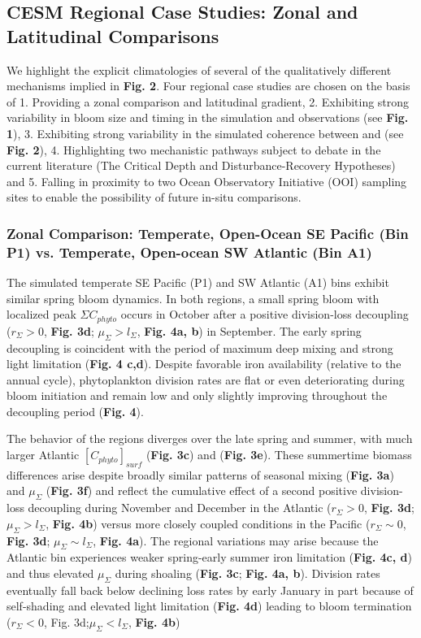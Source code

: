 \subsection{CESM Regional Case Studies: Zonal and Latitudinal Comparisons}

We highlight the explicit climatologies of several of the qualitatively different mechanisms implied in \textbf{Fig. 2}. Four regional case studies are chosen on the basis of 1. Providing a zonal comparison and latitudinal gradient, 2. Exhibiting strong variability in bloom size and timing in the simulation and observations (see \textbf{Fig. 1}), 3. Exhibiting strong variability in the simulated coherence between  and  (see \textbf{Fig. 2}), 4. Highlighting two mechanistic pathways subject to debate in the current literature (The Critical Depth and Disturbance-Recovery Hypotheses) and 5. Falling in proximity to two Ocean Observatory Initiative (OOI) sampling sites to enable the possibility of future in-situ comparisons. 

\subsubsection{Zonal Comparison: Temperate, Open-Ocean SE Pacific (Bin P1) vs. Temperate, Open-ocean SW Atlantic (Bin A1)}

The simulated temperate SE Pacific (P1) and SW Atlantic (A1) bins exhibit similar spring bloom dynamics. In both regions, a small spring bloom with localized peak $\Sigma C_{phyto}$ occurs in October after a positive division-loss decoupling ($r_\Sigma > 0$, \textbf{Fig. 3d}; $\mu_\Sigma > l_\Sigma$, \textbf{Fig. 4a, b}) in September. The early spring decoupling is coincident with the period of maximum deep mixing and strong light limitation (\textbf{Fig. 4 c,d}). Despite favorable iron availability (relative to the annual cycle), phytoplankton division rates are flat or even deteriorating during bloom initiation and remain low and only slightly improving throughout the decoupling period (\textbf{Fig. 4}).  

The behavior of the regions diverges over the late spring and summer, with much larger Atlantic $[C_{phyto}]_{surf}$ (\textbf{Fig. 3c}) and  (\textbf{Fig. 3e}). These summertime biomass differences arise despite broadly similar patterns of seasonal mixing (\textbf{Fig. 3a}) and $\mu_\Sigma$ (\textbf{Fig. 3f}) and reflect the cumulative effect of a second positive division-loss decoupling during November and December in the Atlantic ($r_\Sigma>0$, \textbf{Fig. 3d}; $\mu_\Sigma > l_\Sigma$, \textbf{Fig. 4b}) versus more closely coupled conditions in the Pacific ($r_\Sigma \sim 0$, \textbf{Fig. 3d}; $\mu_\Sigma \sim l_\Sigma$, \textbf{Fig. 4a}). The regional variations may arise because the Atlantic bin experiences weaker spring-early summer iron limitation (\textbf{Fig. 4c, d}) and thus elevated $\mu_\Sigma$ during shoaling (\textbf{Fig. 3c}; \textbf{Fig. 4a, b}). Division rates eventually fall back below declining loss rates by early January in part because of self-shading and elevated light limitation (\textbf{Fig. 4d}) leading to bloom termination ($r_\Sigma < 0$, Fig. 3d;$\mu_\Sigma < l_\Sigma$, \textbf{Fig. 4b}) 


